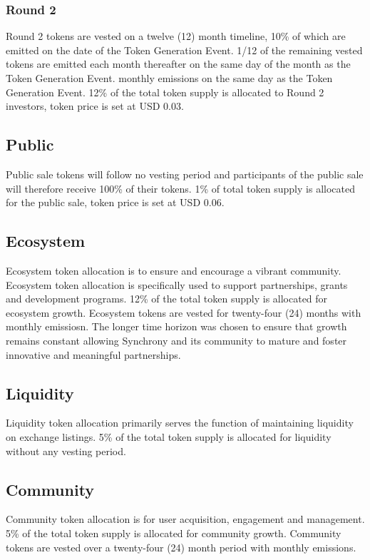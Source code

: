 \documentclass[10pt]{article}
\begin{document}
					\subsubsection{Round 2}
					Round 2 tokens are vested on a twelve (12) month timeline, 10\% of which are
					emitted on the date of the Token Generation Event. 1/12 of the remaining vested
					tokens are emitted each month thereafter on the same day of the month as the
					Token Generation Event.
					monthly emissions on the same day as the Token Generation Event. 12\% of the total
					token supply is allocated to Round 2 investors, token price is set at USD 0.03.

					\subsection{Public}
					Public sale tokens will follow no vesting period and participants of the public
					sale will therefore receive
					100\% of their tokens. 1\% of total token supply is allocated for the public sale,
					token price is set at USD 0.06.

					\subsection{Ecosystem}
					Ecosystem token allocation is to ensure and encourage a vibrant community.
					Ecosystem token allocation is specifically used to support partnerships,
					grants and development programs. 12\% of the total token
					supply is allocated for ecosystem growth. Ecosystem tokens are vested for
					twenty-four (24) months with monthly emissiosn. The longer time horizon
					was chosen to ensure that growth remains constant allowing Synchrony and its
					community to mature and foster innovative and meaningful partnerships.

					\subsection{Liquidity}
					Liquidity token allocation primarily serves the function of maintaining
					liquidity on exchange listings. 5\% of the total token supply is allocated for
					liquidity without any vesting period.

					\subsection{Community}
					Community token allocation is for user acquisition, engagement and management.
					5\% of the total token supply is allocated for community growth. Community
					tokens are vested over a twenty-four (24) month period with monthly emissions.
\end{document}
